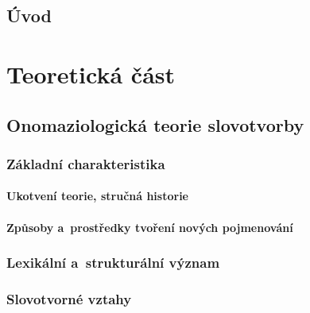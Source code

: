 \hypertarget{uxfavod}{%
\chapter*{Úvod}\label{uvod}
}

\part{Teoretická část}

\hypertarget{onomaziologickuxe1-teorie-slovotvorby}{%
\chapter{Onomaziologická teorie
slovotvorby}\label{onomaziologickuxe1-teorie-slovotvorby}}

\hypertarget{zuxe1kladnuxed-charakteristika}{%
\section{Základní
charakteristika}\label{zuxe1kladnuxed-charakteristika}}

\hypertarget{ukotvenuxed-teorie-struux10dnuxe1-historie}{%
\subsection{Ukotvení teorie, stručná
historie}\label{ukotvenuxed-teorie-struux10dnuxe1-historie}}

\hypertarget{zpux16fsoby-a-prostux159edky-tvoux159enuxed-novuxfdch-pojmenovuxe1nuxed}{%
\subsection{Způsoby a~prostředky tvoření nových
pojmenování}\label{zpux16fsoby-a-prostux159edky-tvoux159enuxed-novuxfdch-pojmenovuxe1nuxed}}

\hypertarget{lexikuxe1lnuxed-a-strukturuxe1lnuxed-vuxfdznam}{%
\section{Lexikální a~strukturální
význam}\label{lexikuxe1lnuxed-a-strukturuxe1lnuxed-vuxfdznam}}

\hypertarget{slovotvornuxe9-vztahy}{%
\section{Slovotvorné vztahy}\label{slovotvornuxe9-vztahy}}

